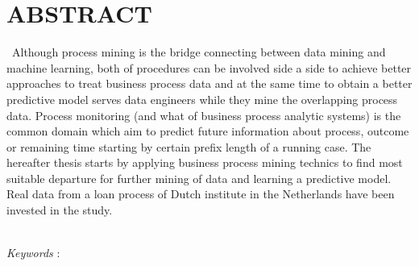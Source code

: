 \clearpage
{}
{}
\chapter*{ABSTRACT}
\ {A}lthough process mining is the bridge connecting between data mining and machine learning, both of procedures can be involved side a side to achieve better approaches to treat business process data  and at the same time to obtain a better predictive model serves data engineers while they mine the overlapping process data.
Process monitoring (and what of business process analytic systems) is the common domain which aim to predict future information about process, outcome or remaining time starting by certain prefix length of a running case.
The hereafter thesis starts by applying business process mining technics to find most suitable departure for further mining of data and learning a predictive model. Real data from a loan process of Dutch institute in the Netherlands have been invested in the study.


\\

\textit{Keywords} :